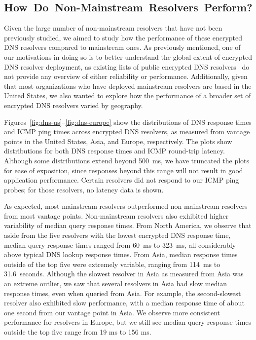 \subsection{\mbox{How Do Non-Mainstream Resolvers Perform?}}

Given the large number of non-mainstream resolvers that have not been
previously studied, we aimed to study how
the performance of these encrypted DNS resolvers compared to mainstream ones.
As previously mentioned, one of our motivations in doing so is to better
understand the global extent of encrypted DNS resolver deployment, as existing
lists of public encrypted DNS resolvers~\cite{dnscrypt-public-resolvers} do
not provide any overview of either reliability or performance. Additionally,
given that most organizations who have deployed mainstream resolvers are based
in the United States, we also wanted to explore how the performance of a
broader set of encrypted DNS resolvers varied by geography.

Figures~\ref{fig:dns-us}--\ref{fig:dns-europe} show the distributions of DNS
response times and ICMP ping times across encrypted DNS resolvers, as measured
from vantage points in the United States, Asia, and Europe, respectively. The
plots show distributions for both DNS response times and ICMP round-trip latency. 
Although some distributions extend beyond 500~ms, we have truncated the plots
for ease of exposition, since responses beyond this range will not result in
good application performance.
Certain resolvers did not respond to our ICMP ping probes; for those
resolvers, no latency data is shown.


As expected, most mainstream resolvers outperformed non-mainstream resolvers
from most vantage points.
Non-mainstream resolvers also exhibited higher variability of 
median query response times.  
From North America, we observe that aside from the five resolvers with the
lowest encrypted DNS response time,
median query response times ranged from 
60~ms to 323~ms, all considerably above typical DNS lookup response times. From Asia, median response times outside
of the top five were extremely variable, ranging from 114~ms to 31.6~seconds. 
Although the slowest resolver in Asia as measured from Asia was an extreme
outlier, we saw that several resolvers in Asia had slow median response times,
even when queried from Asia. For example,
the second-slowest resolver also exhibited slow performance, with a median
response time of about one second from our vantage point in Asia.
We observe more
consistent performance for resolvers in Europe, but we still
see median query response times outside the top five range from 19 ms to
156 ms.

